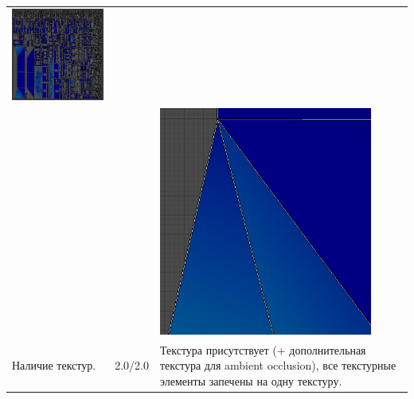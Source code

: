 \begin{longtable}{|p{4cm}|p{2.5cm}|p{7.5cm}|}
    \includegraphics[width=7cm]{src/uv_9}\\
    & & \includegraphics[width=7cm]{src/uv_10}\\
    \hline
    Наличие текстур. & 2.0/2.0 & Текстура присутствует (+ дополнительная текстура для ambient occlusion), все текстурные элементы запечены на одну текстуру.


\end{longtable}
